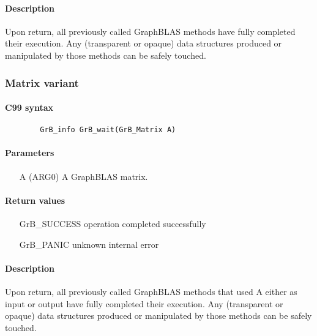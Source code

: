 \paragraph{Description}

Upon return, all previously called GraphBLAS methods have fully completed their execution.
Any (transparent or opaque) data structures produced or manipulated by those methods can be safely touched.

\subsubsection{Matrix variant}

\paragraph{C99 syntax}

\begin{verbatim}
        GrB_info GrB_wait(GrB_Matrix A)
\end{verbatim}

\paragraph{Parameters}

\begin{itemize}[leftmargin=1.1in]
	\item[{\sf A}]	({\sf ARG0}) A GraphBLAS matrix.
\end{itemize}

\paragraph{Return values}
\begin{itemize}[leftmargin=2.1in]
\item[{\sf GrB\_SUCCESS}]	operation completed successfully
\item[{\sf GrB\_PANIC}]		unknown internal error
\end{itemize}

\paragraph{Description}

Upon return, all previously called GraphBLAS methods that used {\sf A} either as input or output have fully completed their execution.
Any (transparent or opaque) data structures produced or manipulated by those methods can be safely touched.

